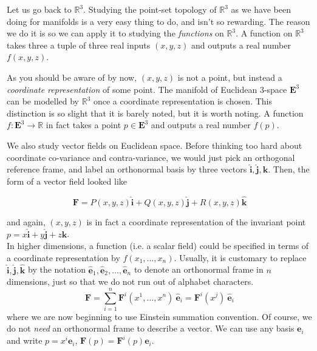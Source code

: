 \documentclass[../master.tex]{subfiles}
\begin{document}
	Let us go back to $\mathbb{R}^3$. Studying the point-set topology of $\mathbb{R}^3$ as we have been doing for manifolds is a very easy thing to do, and isn't so rewarding. The reason we do it is so we can apply it to studying the \emph{functions} on $\mathbb{R}^3$. A function on $\mathbb{R}^3$ takes three a tuple of three real inputs $(x,y,z)$ and outputs a real number $f(x,y,z)$.
	
	As you should be aware of by now, $(x,y,z)$ is not a point, but instead a \emph{coordinate representation} of some point. The manifold of Euclidean 3-space $\mathbf{E}^3$ can be modelled by $\mathbb{R}^3$ once a coordinate representation is chosen. This distinction is so slight that it is barely noted, but it is worth noting. A function $f: \mathbf{E}^3 \rightarrow \mathbb{R}$ in fact takes a point $p \in \mathbf{E}^3$ and outputs a real number $f(p)$.
	
	We also study vector fields on Euclidean space. Before thinking too hard about coordinate co-variance and contra-variance, we would just pick an orthogonal reference frame, and label an orthonormal basis by three vectors $\hat{\mathbf{i}},\hat{\mathbf{j}},\hat{\mathbf{k}}$. Then, the form of a vector field looked like
	
	\begin{equation*}
		\mathbf{F} = P(x,y,z)\hat{\mathbf{i}} + Q(x,y,z)\hat{\mathbf{j}} + R(x,y,z)\hat{\mathbf{k}}
	\end{equation*}
	
	and again, $(x,y,z)$ is in fact a coordinate representation of the invariant point $p = x \hat{\mathbf{i}} + y \hat{\mathbf{j}} + z \hat{\mathbf{k}}$.\\
	
	In higher dimensions, a function (i.e. a scalar field) could be specified in terms of a coordinate representation by $f(x_1, \dots, x_n)$. Usually, it is customary to replace $\hat{\mathbf{i}}, \hat{\mathbf{j}}, \hat{\mathbf{k}}$ by the notation $\hat{\mathbf{e}}_1, \hat{\mathbf{e}}_2, \dots, \hat{\mathbf{e}}_n$ to denote an orthonormal frame in $n$ dimensions, just so that we do not run out of alphabet characters.
	\begin{equation*}
		\mathbf{F} = \sum_{i = 1}^n \mathbf{F}^i(x^1, \dots , x^n) ~ \hat{\mathbf{e}}_i = \mathbf{F}^i(x^j) ~\hat{\mathbf{e}}_i
	\end{equation*}
	where we are now beginning to use Einstein summation convention. Of course, we do not \emph{need} an orthonormal frame to describe a vector. We can use any basis $\mathbf e_i$ and write $p = x^i \mathbf e_i$, $\mathbf{F}(p) = \mathbf{F}^i(p) \mathbf e_i$.
	
\end{document}
